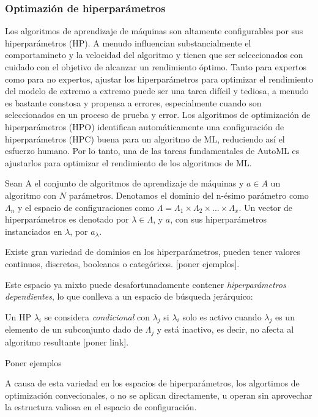 \subsubsection{Optimazión de hiperparámetros}

Los algoritmos de aprendizaje de máquinas son altamente configurables por sus hiperparámetros (HP). A menudo influencian substancialmente el comportamineto y la velocidad del algoritmo y tienen que ser seleccionados con cuidado con el objetivo de alcanzar un rendimiento óptimo. Tanto para expertos como para no expertos, ajustar los hiperparámetros para optimizar el rendimiento del modelo de extremo a extremo puede ser una tarea difícil y tediosa, a menudo es bastante constosa y propensa a errores, especialmente cuando son seleccionados en un proceso de prueba y error. Los algoritmos de optimización de hiperparámetros (HPO) identifican automáticamente una configuración de hiperparámetros (HPC) buena para un algoritmo de ML, reduciendo así el esfuerzo humano. Por lo tanto, una de las tareas fundamentales de AutoML es ajustarlos para optimizar el rendimiento de los algoritmos de ML. 

\begin{definition}
	Sean A el conjunto de algoritmos de aprendizaje de máquinas y $a \in A$ un algoritmo con $N$ parámetros. Denotamos el dominio del n-ésimo parámetro como $\Lambda_n$ y el espacio de configuraciones como $\Lambda = \Lambda_1 \times \Lambda_2 \times ... \times \Lambda_x$. Un vector de hiperparámetros es denotado por $\lambda \in \Lambda$, y $a$, con sus hiperparámetros instanciados en $\lambda$, por $a_\lambda$.
\end{definition}


Existe gran variedad de dominios en los hiperparámetros, pueden tener valores continuos, discretos, booleanos o categóricos. [poner ejemplos]. 

Este espacio ya mixto puede desafortunadamente contener \textit{hiperparámetros dependientes}, lo que conlleva a un espacio de búsqueda jerárquico: 

\begin{definition}
	Un HP $\lambda_i$ se considera \textit{condicional} con $\lambda_j$ si $\lambda_i$ solo es activo cuando $\lambda_j$ es un elemento de un subconjunto dado de $\Lambda_j$ y está inactivo, es decir, no afecta al algoritmo resultante [poner link].  
\end{definition} 

Poner ejemplos

A causa de esta variedad en los espacios de hiperparámetros, los algortimos de optimización convecionales, o no se aplican directamente, u operan sin aprovechar la estructura valiosa en el espacio de configuración.

